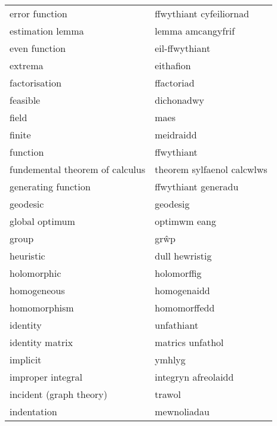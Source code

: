 \begin{supertabular}{p{0.22\textwidth}p{0.22\textwidth}}
                   error function &          ffwythiant cyfeiliornad \\
                 estimation lemma &                lemma amcangyfrif \\
                    even function &                   eil-ffwythiant \\
                          extrema &                        eithafion \\
                    factorisation &                       ffactoriad \\
                         feasible &                       dichonadwy \\
                            field &                             maes \\
                           finite &                        meidraidd \\
                         function &                       ffwythiant \\
  fundemental theorem of calculus &       theorem sylfaenol calcwlws \\
              generating function &              ffwythiant generadu \\
                         geodesic &                         geodesig \\
                   global optimum &                     optimwm eang \\
                            group &                             grŵp \\
                        heuristic &                   dull hewristig \\
                      holomorphic &                      holomorffig \\
                      homogeneous &                      homogenaidd \\
                     homomorphism &                     homomorffedd \\
                         identity &                       unfathiant \\
                  identity matrix &                 matrics unfathol \\
                         implicit &                           ymhlyg \\
                improper integral &              integryn afreolaidd \\
          incident (graph theory) &                           trawol \\
                      indentation &                      mewnoliadau \\

\end{supertabular}
